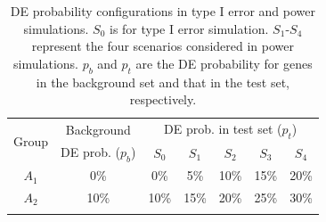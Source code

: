 \documentclass[a4,center,fleqn]{NAR}
\begin{document}
	
	
		\begin{table}[!ht]
		\centering
		\caption{DE probability configurations in type I error and power simulations. $S_0$ is for
			type I error simulation. $S_1$-$S_4$ represent the four scenarios considered in power simulations. $p_b$ and $p_t$ are the DE probability for genes in the background set and that in the test set, respectively.}
			
		\begin{tabular}{ccccccc}
			\toprule
			\multirow{2}{*}{Group} & 	Background & \multicolumn{5}{c}{DE prob. in test set ($p_t$)}\\
			&DE prob. ($p_b$)&$S_0$ &$S_1$ &$S_2$ &$S_3$ &$S_4$\\
			\colrule
			$A_1$ & 0\% & 0\%  & 5\% & 10\% & 15\% & 20\%\\ 
			$A_2$ & 10\% & 10\% & 15\%& 20\%& 25\% & 30\%\\  
		\botrule
		\end{tabular}
		
		\label{table:simusetup}
	\end{table}
	
\end{document}
